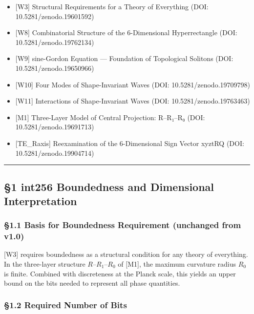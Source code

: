 \documentclass[a4paper,11pt]{article}
\providecommand{\tightlist}{\setlength{\itemsep}{0pt}\setlength{\parskip}{0pt}}
\begin{document}
\begin{itemize}
\tightlist
\item
  {[}W3{]} Structural Requirements for a Theory of Everything (DOI:
  10.5281/zenodo.19601592)
\item
  {[}W8{]} Combinatorial Structure of the 6-Dimensional Hyperrectangle
  (DOI: 10.5281/zenodo.19762134)
\item
  {[}W9{]} sine-Gordon Equation --- Foundation of Topological Solitons
  (DOI: 10.5281/zenodo.19650966)
\item
  {[}W10{]} Four Modes of Shape-Invariant Waves (DOI:
  10.5281/zenodo.19709798)
\item
  {[}W11{]} Interactions of Shape-Invariant Waves (DOI:
  10.5281/zenodo.19763463)
\item
  {[}M1{]} Three-Layer Model of Central Projection: R--R₁--R₀ (DOI:
  10.5281/zenodo.19691713)
\item
  {[}TE\_Raxis{]} Reexamination of the 6-Dimensional Sign Vector xyztRQ
  (DOI: 10.5281/zenodo.19904714)
\end{itemize}

\begin{center}\rule{0.5\linewidth}{0.5pt}\end{center}

\subsection{§1 int256 Boundedness and Dimensional
Interpretation}\label{int256-boundedness-and-dimensional-interpretation}

\subsubsection{§1.1 Basis for Boundedness Requirement (unchanged from
v1.0)}\label{basis-for-boundedness-requirement-unchanged-from-v1.0}

{[}W3{]} requires boundedness as a structural condition for any theory
of everything. In the three-layer structure \(R\)--\(R_1\)--\(R_0\) of
{[}M1{]}, the maximum curvature radius \(R_0\) is finite. Combined with
discreteness at the Planck scale, this yields an upper bound on the bits
needed to represent all phase quantities.

\subsubsection{§1.2 Required Number of
Bits}\label{required-number-of-bits}
\end{document}
